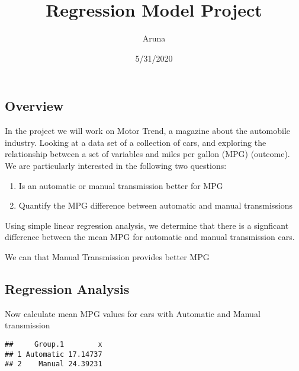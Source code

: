 \documentclass[
]{article}
\title{Regression Model Project}
\author{Aruna}
\date{5/31/2020}
\newenvironment{Shaded}{\begin{snugshade}}{\end{snugshade}}
\newcommand{\DataTypeTok}[1]{\textcolor[rgb]{0.13,0.29,0.53}{#1}}
\newcommand{\KeywordTok}[1]{\textcolor[rgb]{0.13,0.29,0.53}{\textbf{#1}}}
\newcommand{\NormalTok}[1]{#1}
\newcommand{\OperatorTok}[1]{\textcolor[rgb]{0.81,0.36,0.00}{\textbf{#1}}}
\providecommand{\tightlist}{%
  \setlength{\itemsep}{0pt}\setlength{\parskip}{0pt}}
\begin{document}
\maketitle

\hypertarget{overview}{%
\subsection{Overview}\label{overview}}

In the project we will work on Motor Trend, a magazine about the
automobile industry. Looking at a data set of a collection of cars, and
exploring the relationship between a set of variables and miles per
gallon (MPG) (outcome). We are particularly interested in the following
two questions:

\begin{enumerate}
\def\labelenumi{\arabic{enumi}.}
\tightlist
\item
  Is an automatic or manual transmission better for MPG
\item
  Quantify the MPG difference between automatic and manual transmissions
\end{enumerate}

Using simple linear regression analysis, we determine that there is a
signficant difference between the mean MPG for automatic and manual
transmission cars.

We can that Manual Transmission provides better MPG

\hypertarget{regression-analysis}{%
\subsection{Regression Analysis}\label{regression-analysis}}

Now calculate mean MPG values for cars with Automatic and Manual
transmission

\begin{Shaded}
\end{Shaded}

\begin{verbatim}
##     Group.1        x
## 1 Automatic 17.14737
## 2    Manual 24.39231
\end{verbatim}
\end{document}
